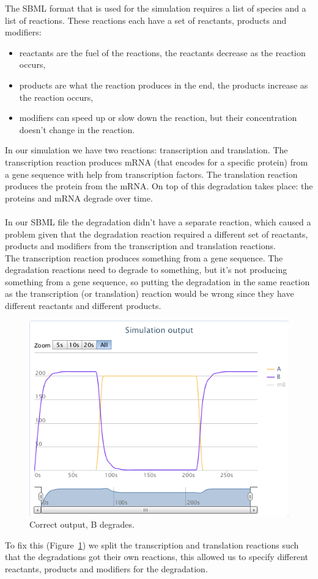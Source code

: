\noindent The SBML format that is used for the simulation requires a list of species and a list of reactions. These reactions each have a set of reactants, products and modifiers:
\begin{itemize}
	\item reactants are the fuel of the reactions, the reactants decrease as the reaction occurs,
	\item products are what the reaction produces in the end, the products increase as the reaction occurs,
	\item modifiers can speed up or slow down the reaction, but their concentration doesn't change in the reaction.
\end{itemize}
In our simulation we have two reactions: transcription and translation. The transcription reaction produces mRNA (that encodes for a specific protein) from a gene sequence with help from transcription factors. The translation reaction produces the protein from the mRNA. On top of this degradation takes place: the proteins and mRNA degrade over time.\\
\\
In our SBML file the degradation didn't have a separate reaction, which caused a problem given that the degradation reaction required a different set of reactants, products and modifiers from the transcription and translation reactions.\\
The transcription reaction produces something from a gene sequence. The degradation reactions need to degrade to something, but it's not producing something from a gene sequence, so putting the degradation in the same reaction as the transcription (or translation) reaction would be wrong since they have different reactants and different products.\\

\begin{figure}[h!]
	\centering\includegraphics[scale=0.5]{../../screenshots/2012-06-14-not-output.png}
	\caption{Correct output, B degrades.}
	\label{fig:correct}
\end{figure}

To fix this (Figure~\ref{fig:correct}) we split the transcription and translation reactions such that the degradations got their own reactions, this allowed us to specify different reactants, products and modifiers for the degradation.
